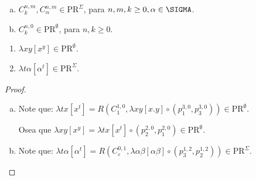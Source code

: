   \begin{lemma}
    \begin{enumerate}[a)]
      \item $C_{k}^{n, m}, C_{\alpha}^{n, m} \in \mathrm{PR}^{\Sigma}$, para $n, m, k \geq 0, \alpha \in \SIGMA$.
      \item $C_{k}^{n, 0} \in \mathrm{PR}^{\emptyset}$, para $n, k \geq 0$.
    \end{enumerate}
  \end{lemma}

  \begin{lemma}
    \begin{enumerate}
      \item $\lambda xy \left[x^{y}\right] \in \mathrm{PR}^{\emptyset}$.
      \item $\lambda t \alpha \left[\alpha^{t}\right] \in \mathrm{PR}^{\Sigma}$.
    \end{enumerate}
  \end{lemma}
  \begin{proof}
    \begin{enumerate}[a)]
      \item Note que: $\lambda tx \left[x^{t}\right] = R(C_{1}^{1, 0}, \lambda xy \left[x.y\right] \circ (p_{1}^{3, 0}, p_{3}^{3, 0})) \in \mathrm{PR}^{\emptyset}$.

        \par Osea que $\lambda xy \left[x^{y}\right] = \lambda tx \left[x^{t}\right] \circ (p_{2}^{2, 0}, p_{1}^{2, 0}) \in \mathrm{PR}^{\emptyset}$.
      \item Note que: $\lambda t \alpha \left[\alpha^{t}\right] = R(C_{\varepsilon}^{0, 1}, \lambda \alpha \beta \left[\alpha \beta\right] \circ (p_{3}^{1, 2}, p_{2}^{1, 2})) \in \mathrm{PR}^{\Sigma}$.
    \end{enumerate}
  \end{proof}

